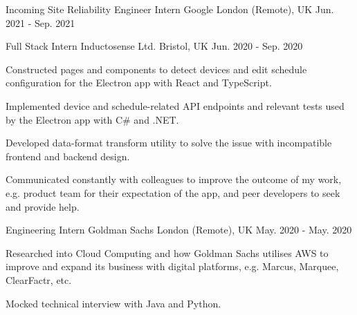 

\begin{cventries}

  \cventry
    {Incoming Site Reliability Engineer Intern} %
    {Google} %
    {London (Remote), UK} %
    {Jun. 2021 - Sep. 2021} %
    {
      \begin{cvitems} %
      \end{cvitems}
    }

  \cventry
    {Full Stack Intern} %
    {Inductosense Ltd.} %
    {Bristol, UK} %
    {Jun. 2020 - Sep. 2020} %
    {
      \begin{cvitems} %
        \item {Constructed pages and components to detect devices and edit schedule configuration for the Electron app with React and TypeScript.}
        \item {Implemented device and schedule-related API endpoints and relevant tests used by the Electron app with C\# and .NET.}
        \item {Developed data-format transform utility to solve the issue with incompatible frontend and backend design.}
        \item {Communicated constantly with colleagues to improve the outcome of my work, e.g. product team for their expectation of the app, and peer developers to seek and provide help.}
      \end{cvitems}
    }

  \cventry
    {Engineering Intern} %
    {Goldman Sachs} %
    {London (Remote), UK} %
    {May. 2020 - May. 2020} %
    {
      \begin{cvitems} %
        \item {Researched into Cloud Computing and how Goldman Sachs utilises AWS to improve and expand its business with digital platforms, e.g. Marcus, Marquee, ClearFactr, etc.}
        \item {Mocked technical interview with Java and Python.}
      \end{cvitems}
    }


\end{cventries}
